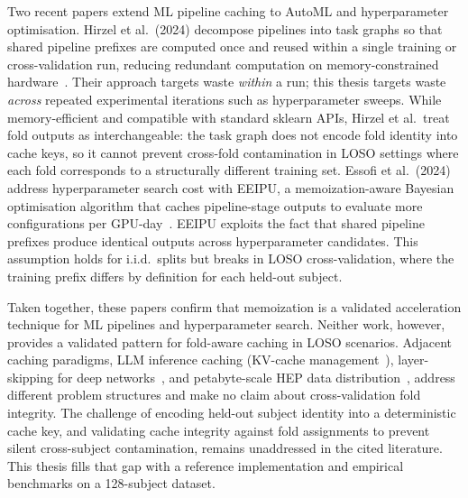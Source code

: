 Two recent papers extend ML pipeline caching to AutoML and hyperparameter
optimisation. Hirzel et al.\ (2024) decompose pipelines into task graphs so
that shared pipeline prefixes are computed once and reused within a single
training or cross-validation run, reducing redundant computation on
memory-constrained hardware~\cite{hirzel2024pipelines}. Their approach
targets waste \textit{within} a run; this thesis targets waste \textit{across}
repeated experimental iterations such as hyperparameter sweeps. While
memory-efficient and compatible with standard sklearn APIs, Hirzel et al.\
treat fold outputs as interchangeable: the task graph does not encode fold
identity into cache keys, so it cannot prevent cross-fold contamination in
LOSO settings where each fold corresponds to a structurally different training
set.
Essofi et al.\ (2024) address hyperparameter search cost with EEIPU, a
memoization-aware Bayesian optimisation algorithm that caches pipeline-stage
outputs to evaluate more configurations per GPU-day~\cite{essofi2024eeipu}.
EEIPU exploits the fact that shared pipeline prefixes produce identical
outputs across hyperparameter candidates. This assumption holds for i.i.d.\
splits but breaks in LOSO cross-validation, where the training prefix differs
by definition for each held-out subject.

Taken together, these papers confirm that memoization is a validated
acceleration technique for ML pipelines and hyperparameter search.
Neither work, however, provides a validated pattern for fold-aware caching in
LOSO scenarios. Adjacent caching paradigms, LLM inference caching
(KV-cache management~\cite{kwon2023pagedattention}), layer-skipping for deep
networks~\cite{balasubramanian2021gati}, and petabyte-scale HEP data
distribution~\cite{sim2023xcache}, address different problem structures and
make no claim about cross-validation fold integrity. The challenge of encoding
held-out subject identity into a deterministic cache key, and validating
cache integrity against fold assignments to prevent silent cross-subject
contamination, remains unaddressed in the cited literature. This thesis
fills that gap with a reference implementation and empirical benchmarks on a
128-subject dataset.


